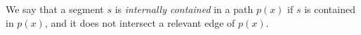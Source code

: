 \documentclass[runningheads]{llncs}
\newtheorem{fac}{Fact}[section]
\begin{document}

% 




\begin{definition}
We say that a segment $s$ is \emph{internally contained} in a path $p(x)$ if $s$ is contained in $p(x)$, and it does not intersect a relevant edge of $p(x)$. 
\end{definition}

\end{document}
